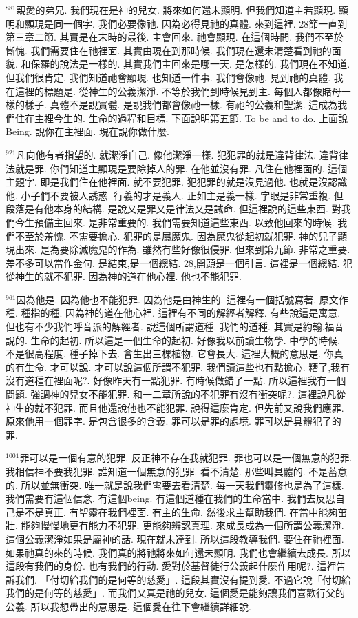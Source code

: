 \documentclass{book}
\begin{document}
$^{881}$親愛的弟兄.
我們現在是神的兒女.
將來如何還未顯明.
但我們知道主若顯現.
顯明和顯現是同一個字.
我們必要像祂.
因為必得見祂的真體.
來到這裡.
28節一直到第三章二節.
其實是在末時的最後.
主會回來.
祂會顯現.
在這個時間.
我們不至於慚愧.
我們需要住在祂裡面.
其實由現在到那時候.
我們現在還未清楚看到祂的面貌.
和保羅的說法是一樣的.
其實我們主回來是哪一天.
是怎樣的.
我們現在不知道.
但我們很肯定.
我們知道祂會顯現.
也知道一件事.
我們會像祂.
見到祂的真體.
我在這裡的標題是.
從神生的公義潔淨.
不等於我們到時候見到主.
每個人都像賭母一樣的樣子.
真體不是說實體.
是說我們都會像祂一樣.
有祂的公義和聖潔.
這成為我們住在主裡今生的.
生命的過程和目標.
下面說明第五節.
To be and to do.
上面說Being.
說你在主裡面.
現在說你做什麼.

$^{921}$凡向他有者指望的.
就潔淨自己.
像他潔淨一樣.
犯犯罪的就是違背律法.
違背律法就是罪.
你們知道主顯現是要除掉人的罪.
在他並沒有罪.
凡住在他裡面的.
這個主題字.
即是我們住在他裡面.
就不要犯罪.
犯犯罪的就是沒見過他.
也就是沒認識他.
小子們不要被人誘惑.
行義的才是義人.
正如主是義一樣.
字眼是非常重複.
但段落是有他本身的結構.
是說又是罪又是律法又是誡命.
但這裡說的這些東西.
對我們今生預備主回來.
是非常重要的.
我們需要知道這些東西.
以致他回來的時候.
我們不至於羞愧.
不需要擔心.
犯罪的是屬魔鬼.
因為魔鬼從起初就犯罪.
神的兒子顯現出來.
是為要除滅魔鬼的作為.
雖然有些好像很侵罪.
但來到第九節.
非常之重要.
差不多可以當作金句.
是結束,是一個總結.
28,開頭是一個引言.
這裡是一個總結.
犯從神生的就不犯罪.
因為神的道在他心裡.
他也不能犯罪.

$^{961}$因為他是.
因為他也不能犯罪.
因為他是由神生的.
這裡有一個括號寫著.
原文作種.
種指的種.
因為神的道在他心裡.
這裡有不同的解經者解釋.
有些說這是寓意.
但也有不少我們呼音派的解經者.
說這個所謂道種.
我們的道種.
其實是約翰.福音說的.
生命的起初.
所以這是一個生命的起初.
好像我以前讀生物學.
中學的時候.
不是很高程度.
種子掉下去.
會生出三棵植物.
它會長大.
這裡大概的意思是.
你真的有生命.
才可以說.
才可以說這個所謂不犯罪.
我們讀這些也有點擔心.
糟了,我有沒有道種在裡面呢?.
好像昨天有一點犯罪.
有時候做錯了一點.
所以這裡我有一個問題.
強調神的兒女不能犯罪.
和一二章所說的不犯罪有沒有衝突呢?.
這裡說凡從神生的就不犯罪.
而且他還說他也不能犯罪.
說得這麼肯定.
但先前又說我們應罪.
原來他用一個罪字.
是包含很多的含義.
罪可以是罪的處境.
罪可以是具體犯了的罪.

$^{1001}$罪可以是一個有意的犯罪.
反正神不存在我就犯罪.
罪也可以是一個無意的犯罪.
我相信神不要我犯罪.
誰知道一個無意的犯罪.
看不清楚.
那些叫具體的.
不是蓄意的.
所以並無衝突.
唯一就是說我們需要去看清楚.
每一天我們靈修也是為了這樣.
我們需要有這個信念.
有這個being.
有這個道種在我們的生命當中.
我們去反思自己是不是真正.
有聖靈在我們裡面.
有主的生命.
然後求主幫助我們.
在當中能夠茁壯.
能夠慢慢地更有能力不犯罪.
更能夠辨認真理.
來成長成為一個所謂公義潔淨.
這個公義潔淨如果是屬神的話.
現在就未達到.
所以這段教導我們.
要住在祂裡面.
如果祂真的來的時候.
我們真的將祂將來如何還未顯明.
我們也會繼續去成長.
所以這段有我們的身份.
也有我們的行動.
愛對於基督徒行公義起什麼作用呢?.
這裡告訴我們.
「付切給我們的是何等的慈愛」.
這段其實沒有提到愛.
不過它說「付切給我們的是何等的慈愛」.
而我們又真是祂的兒女.
這個愛是能夠讓我們喜歡行父的公義.
所以我想帶出的意思是.
這個愛在往下會繼續詳細說.
\end{document}
